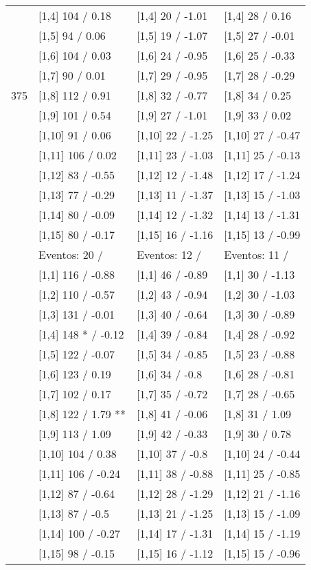 \begin{table}
\begin{tabular}[t]{llll}
 & {}[1,4] 104  / 0.18 & {}[1,4] 20  / -1.01 & {}[1,4] 28  / 0.16\\
 & {}[1,5] 94  / 0.06 & {}[1,5] 19  / -1.07 & {}[1,5] 27  / -0.01\\
 & {}[1,6] 104  / 0.03 & {}[1,6] 24  / -0.95 & {}[1,6] 25  / -0.33\\
 & {}[1,7] 90  / 0.01 & {}[1,7] 29  / -0.95 & {}[1,7] 28  / -0.29\\
375 & {}[1,8] 112  / 0.91 & {}[1,8] 32  / -0.77 & {}[1,8] 34  / 0.25\\
\addlinespace
 & {}[1,9] 101  / 0.54 & {}[1,9] 27  / -1.01 & {}[1,9] 33  / 0.02\\
 & {}[1,10] 91  / 0.06 & {}[1,10] 22  / -1.25 & {}[1,10] 27  / -0.47\\
 & {}[1,11] 106  / 0.02 & {}[1,11] 23  / -1.03 & {}[1,11] 25  / -0.13\\
 & {}[1,12] 83  / -0.55 & {}[1,12] 12  / -1.48 & {}[1,12] 17  / -1.24\\
 & {}[1,13] 77  / -0.29 & {}[1,13] 11  / -1.37 & {}[1,13] 15  / -1.03\\
\addlinespace
 & {}[1,14] 80  / -0.09 & {}[1,14] 12  / -1.32 & {}[1,14] 13  / -1.31\\
 & {}[1,15] 80  / -0.17 & {}[1,15] 16  / -1.16 & {}[1,15] 13  / -0.99\\
 & Eventos:  20 / & Eventos:  12 / & Eventos:  11 /\\
 & {}[1,1] 116  / -0.88 & {}[1,1] 46  / -0.89 & {}[1,1] 30  / -1.13\\
 & {}[1,2] 110  / -0.57 & {}[1,2] 43  / -0.94 & {}[1,2] 30  / -1.03\\
\addlinespace
 & {}[1,3] 131  / -0.01 & {}[1,3] 40  / -0.64 & {}[1,3] 30  / -0.89\\
 & {}[1,4] 148 * / -0.12 & {}[1,4] 39  / -0.84 & {}[1,4] 28  / -0.92\\
 & {}[1,5] 122  / -0.07 & {}[1,5] 34  / -0.85 & {}[1,5] 23  / -0.88\\
 & {}[1,6] 123  / 0.19 & {}[1,6] 34  / -0.8 & {}[1,6] 28  / -0.81\\
 & {}[1,7] 102  / 0.17 & {}[1,7] 35  / -0.72 & {}[1,7] 28  / -0.65\\
\addlinespace
500 & {}[1,8] 122  / 1.79 ** & {}[1,8] 41  / -0.06 & {}[1,8] 31  / 1.09\\
 & {}[1,9] 113  / 1.09 & {}[1,9] 42  / -0.33 & {}[1,9] 30  / 0.78\\
 & {}[1,10] 104  / 0.38 & {}[1,10] 37  / -0.8 & {}[1,10] 24  / -0.44\\
 & {}[1,11] 106  / -0.24 & {}[1,11] 38  / -0.88 & {}[1,11] 25  / -0.85\\
 & {}[1,12] 87  / -0.64 & {}[1,12] 28  / -1.29 & {}[1,12] 21  / -1.16\\
\addlinespace
 & {}[1,13] 87  / -0.5 & {}[1,13] 21  / -1.25 & {}[1,13] 15  / -1.09\\
 & {}[1,14] 100  / -0.27 & {}[1,14] 17  / -1.31 & {}[1,14] 15  / -1.19\\
 & {}[1,15] 98  / -0.15 & {}[1,15] 16  / -1.12 & {}[1,15] 15  / -0.96\\
\bottomrule
\end{tabular}
\end{table}
